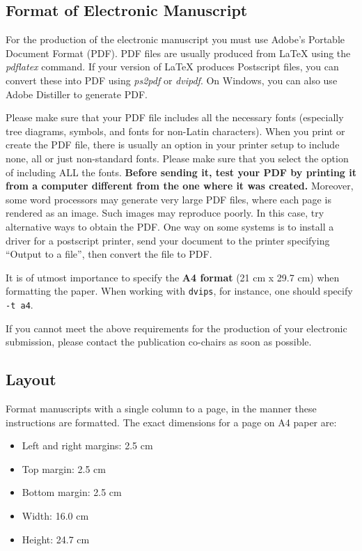 \subsection{Format of Electronic Manuscript}
\label{sect:pdf}

For the production of the electronic manuscript you must use Adobe's
Portable Document Format (PDF). PDF files are usually produced from
\LaTeX{} using the \textit{pdflatex} command. If your version of
\LaTeX{} produces Postscript files, you can convert these into PDF
using \textit{ps2pdf} or \textit{dvipdf}. On Windows, you can also use
Adobe Distiller to generate PDF.

Please make sure that your PDF file includes all the necessary fonts
(especially tree diagrams, symbols, and fonts for non-Latin characters). 
When you print or create the PDF file, there is usually
an option in your printer setup to include none, all or just
non-standard fonts.  Please make sure that you select the option of
including ALL the fonts. \textbf{Before sending it, test your PDF by
  printing it from a computer different from the one where it was
  created.} Moreover, some word processors may generate very large PDF
files, where each page is rendered as an image. Such images may
reproduce poorly. In this case, try alternative ways to obtain the
PDF. One way on some systems is to install a driver for a postscript
printer, send your document to the printer specifying ``Output to a
file'', then convert the file to PDF.

It is of utmost importance to specify the \textbf{A4 format} (21 cm
x 29.7 cm) when formatting the paper. When working with
{\tt dvips}, for instance, one should specify {\tt -t a4}.

If you cannot meet the above requirements
for the
production of your electronic submission, please contact the
publication co-chairs as soon as possible.


\subsection{Layout}
\label{ssec:layout}

Format manuscripts with a single column to a page, in the manner these
instructions are formatted. The exact dimensions for a page on A4
paper are:

\begin{itemize}
\item Left and right margins: 2.5 cm
\item Top margin: 2.5 cm
\item Bottom margin: 2.5 cm
\item Width: 16.0 cm
\item Height: 24.7 cm
\end{itemize}

